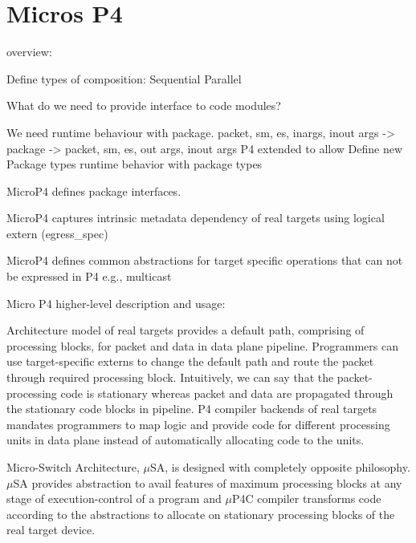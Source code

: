 \documentclass[10pt,sigconf,letterpaper,anonymous]{acmart}
\begin{document}
\section{Micros P4}

overview:


Define types of composition: 
Sequential
Parallel


What do we need to provide interface to code modules?

We need runtime behaviour with package. 
packet, sm, es, inargs, inout args -> package -> packet, sm, es, out args, inout args
P4 extended to 
allow Define new Package types
runtime behavior with package types

MicroP4 defines package interfaces.


MicroP4 captures intrinsic metadata dependency of real targets using logical extern (egress\_spec)

MicroP4 defines common abstractions for target specific operations that can not be expressed in P4
e.g., multicast



Micro P4 higher-level description and usage:


Architecture model of real targets provides a default path, comprising of processing blocks, for packet and data in data plane pipeline.
Programmers can use target-specific externs to change the default path and route the packet through required processing block.
Intuitively, we can say that the packet-processing code is stationary whereas packet and data are propagated through the stationary code blocks in pipeline.
P4 compiler backends of real targets mandates programmers to map logic and provide code for different processing units in data plane instead of automatically allocating code to the units. 

Micro-Switch Architecture, $\mu$SA, is designed with completely opposite philosophy.
$\mu$SA provides abstraction to avail features of maximum processing blocks at any stage of execution-control of a program and $\mu$P4C compiler transforms code according to the abstractions to allocate on stationary processing blocks of the real target device.
\end{document}
